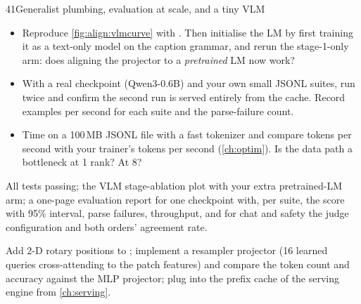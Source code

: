 \begin{labbox}{41}{Generalist plumbing, evaluation at scale, and a tiny VLM}
\begin{itemize}
  \item Reproduce \cref{fig:align:vlmcurve} with . Then initialise the LM by first
        training it as a text-only model on the caption grammar, and rerun the stage-1-only arm: does
        aligning the projector to a \emph{pretrained} LM now work?
  \item With a real checkpoint (Qwen3-0.6B) and your own small JSONL suites, run
         twice and confirm the second run is served entirely from the cache. Record
        examples per second for each suite and the parse-failure count.
  \item Time  on a 100\,MB JSONL file with a fast tokenizer and compare tokens per second
        with your trainer's tokens per second (\cref{ch:optim}). Is the data path a bottleneck at 1 rank? At 8?
\end{itemize}

All tests passing; the VLM stage-ablation plot with your extra pretrained-LM arm; a one-page evaluation
report for one checkpoint with, per suite, the score with 95\% interval, parse failures, throughput, and
for chat and safety the judge configuration and both orders' agreement rate.

Add 2-D rotary positions to ; implement a resampler projector (16 learned queries
cross-attending to the patch features) and compare the token count and accuracy against the MLP projector;
plug  into the prefix cache of the serving engine from \cref{ch:serving}.
\end{labbox}
